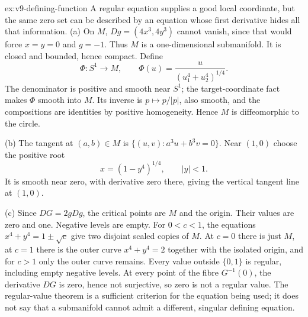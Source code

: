 \begin{solution}{ex:v9-defining-function}
\idea A regular equation supplies a good local coordinate, but the same zero set can be described by an equation whose first derivative hides all that information.
\writeup (a) On $M$, $Dg=(4x^3,4y^3)$ cannot vanish, since that would force $x=y=0$ and $g=-1$. Thus $M$ is a one-dimensional submanifold. It is closed and bounded, hence compact. Define
\[
\Phi:S^1\to M,\qquad \Phi(u)=\frac{u}{(u_1^4+u_2^4)^{1/4}}.
\]
The denominator is positive and smooth near $S^1$; the target-coordinate fact makes $\Phi$ smooth into $M$. Its inverse is $p\mapsto p/|p|$, also smooth, and the compositions are identities by positive homogeneity. Hence $M$ is diffeomorphic to the circle.

(b) The tangent at $(a,b)\in M$ is $\{(u,v):a^3u+b^3v=0\}$. Near $(1,0)$ choose the positive root
\[
x=(1-y^4)^{1/4},\qquad |y|<1.
\]
It is smooth near zero, with derivative zero there, giving the vertical tangent line at $(1,0)$.

(c) Since $DG=2gDg$, the critical points are $M$ and the origin. Their values are zero and one. Negative levels are empty. For $0<c<1$, the equations $x^4+y^4=1\pm\sqrt c$ give two disjoint scaled copies of $M$. At $c=0$ there is just $M$, at $c=1$ there is the outer curve $x^4+y^4=2$ together with the isolated origin, and for $c>1$ only the outer curve remains. Every value outside $\{0,1\}$ is regular, including empty negative levels. At every point of the fibre $G^{-1}(0)$, the derivative $DG$ is zero, hence not surjective, so zero is not a regular value. The regular-value theorem is a sufficient criterion for the equation being used; it does not say that a submanifold cannot admit a different, singular defining equation.
\end{solution}

